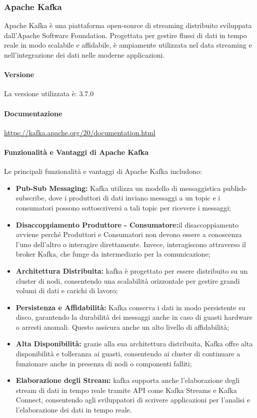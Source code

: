 \subsubsection{Apache Kafka}
Apache Kafka è una piattaforma open-source di streaming distribuito sviluppata dall'Apache Software Foundation. Progettata per gestire flussi di dati in tempo reale in modo scalabile e affidabile, è ampiamente utilizzata nel data streaming e nell'integrazione dei dati nelle moderne applicazioni.

\paragraph{Versione}
La versione utilizzata è: 3.7.0
\paragraph{Documentazione}
\href{https://kafka.apache.org/20/documentation.html}{https://kafka.apache.org/20/documentation.html}

\paragraph{Funzionalità e Vantaggi di Apache Kafka}
Le principali funzionalità e vantaggi di Apache Kafka includono:

\begin{itemize}
  \item \textbf{Pub-Sub Messaging:} Kafka utilizza un modello di messaggistica publish-subscribe, dove i produttori di dati inviano messaggi a un topic e i consumatori possono sottoscriversi a tali topic per ricevere i messaggi;
  \item \textbf{Disaccoppiamento Produttore - Consumatore:}il disaccoppiamento avviene perché Produttori e Consumatori non devono essere a conoscenza l'uno dell'altro o interagire direttamente. Invece, interagiscono attraverso il broker Kafka, che funge da intermediario per la comunicazione;
  \item \textbf{Architettura Distribuita:} kafka è progettato per essere distribuito su un cluster di nodi, consentendo una scalabilità orizzontale per gestire grandi volumi di dati e carichi di lavoro;
  
  \item \textbf{Persistenza e Affidabilità:} Kafka conserva i dati in modo persistente su disco, garantendo la durabilità dei messaggi anche in caso di guasti hardware o arresti anomali. Questo assicura anche un alto livello di affidabilità;
  
  \item \textbf{Alta Disponibilità:} grazie alla sua architettura distribuita, Kafka offre alta disponibilità e tolleranza ai guasti, consentendo ai cluster di continuare a funzionare anche in presenza di nodi o componenti falliti;
  
  \item \textbf{Elaborazione degli Stream:} kafka supporta anche l'elaborazione degli stream di dati in tempo reale tramite API come Kafka Streams e Kafka Connect, consentendo agli sviluppatori di scrivere applicazioni per l'analisi e l'elaborazione dei dati in tempo reale.
\end{itemize}

